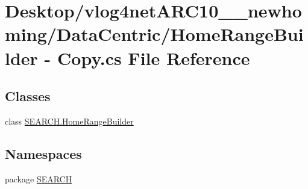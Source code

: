 \hypertarget{_home_range_builder_01-_01_copy_8cs}{\section{Desktop/vlog4net\-A\-R\-C10\-\_\-\_\-newhoming/\-Data\-Centric/\-Home\-Range\-Builder -\/ Copy.\-cs File Reference}
\label{_home_range_builder_01-_01_copy_8cs}
}
\subsection*{Classes}
\begin{DoxyCompactItemize}
\item 
class \hyperlink{class_s_e_a_r_c_h_1_1_home_range_builder}{S\-E\-A\-R\-C\-H.\-Home\-Range\-Builder}
\end{DoxyCompactItemize}
\subsection*{Namespaces}
\begin{DoxyCompactItemize}
\item 
package \hyperlink{namespace_s_e_a_r_c_h}{S\-E\-A\-R\-C\-H}
\end{DoxyCompactItemize}
